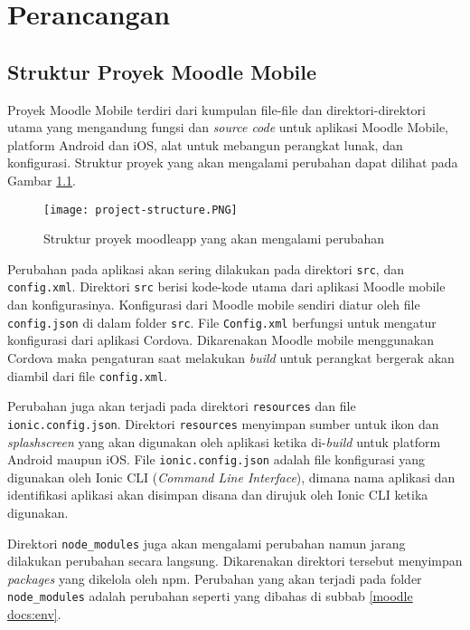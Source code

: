 \chapter{Perancangan}
\label{perancangan} 

\section{Struktur Proyek Moodle Mobile}
\label{struktur proyek}

Proyek Moodle Mobile terdiri dari kumpulan file-file dan direktori-direktori utama yang mengandung fungsi dan \textit{source code} untuk aplikasi Moodle Mobile, platform Android dan iOS, alat untuk mebangun perangkat lunak, dan konfigurasi. Struktur proyek yang akan mengalami perubahan dapat dilihat pada Gambar \ref{moodle:projectstructure}.
\\
\begin{figure}[H]
\centering
\texttt{[image: project-structure.PNG]}
\caption{Struktur proyek moodleapp yang akan mengalami perubahan}
\label{moodle:projectstructure}
\end{figure}

Perubahan pada aplikasi akan sering dilakukan pada direktori \texttt{src}, dan \texttt{config.xml}. Direktori \texttt{src} berisi kode-kode utama dari aplikasi Moodle mobile dan konfigurasinya. Konfigurasi dari Moodle mobile sendiri diatur oleh file \texttt{config.json} di dalam folder \texttt{src}. File \texttt{Config.xml} berfungsi untuk mengatur konfigurasi dari aplikasi Cordova. Dikarenakan Moodle mobile menggunakan Cordova maka pengaturan saat melakukan \textit{build} untuk perangkat bergerak akan diambil dari file \texttt{config.xml}. 

Perubahan juga akan terjadi pada direktori \texttt{resources} dan file \texttt{ionic.config.json}. Direktori \texttt{resources} menyimpan sumber untuk ikon dan \textit{splashscreen} yang akan digunakan oleh aplikasi ketika di-\textit{build} untuk platform Android maupun iOS. File \texttt{ionic.config.json} adalah file konfigurasi yang digunakan oleh  Ionic CLI (\textit{Command Line Interface}), dimana nama aplikasi dan identifikasi aplikasi akan disimpan disana dan dirujuk oleh Ionic CLI ketika digunakan.

Direktori \texttt{node\_modules} juga akan mengalami perubahan namun jarang dilakukan perubahan secara langsung. Dikarenakan direktori tersebut menyimpan \textit{packages} yang dikelola oleh npm. Perubahan yang akan terjadi pada folder \texttt{node\_modules} adalah perubahan seperti yang dibahas di subbab \ref{moodle docs:env}.

